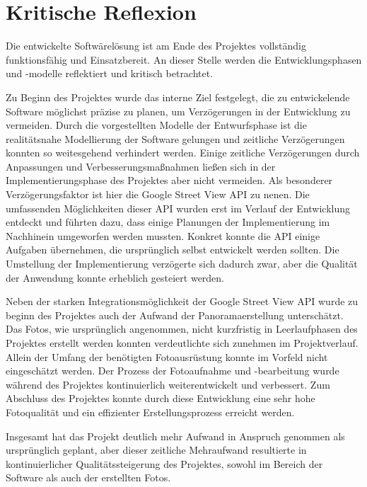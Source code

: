 \section{Kritische Reflexion}
\label{sec:KritischeReflexion}

Die entwickelte Softwärelösung ist am Ende des Projektes vollständig funktionsfähig und Einsatzbereit.
An dieser Stelle werden die Entwicklungsphasen und -modelle reflektiert und kritisch betrachtet.

Zu Beginn des Projektes wurde das interne Ziel festgelegt, die zu entwickelende Software möglichst präzise
zu planen, um Verzögerungen in der Entwicklung zu vermeiden. Durch die vorgestellten Modelle der Entwurfsphase
ist die realitätsnahe Modellierung der Software gelungen und zeitliche Verzögerungen konnten so weitesgehend
verhindert werden. Einige zeitliche Verzögerungen durch Anpassungen und Verbesserungsmaßnahmen ließen sich in der
Implementierungsphase des Projektes aber nicht vermeiden. Als besonderer Verzögerungsfaktor ist hier die
Google Street View API zu nenen. Die umfassenden Möglichkeiten dieser API wurden erst im Verlauf der
Entwicklung entdeckt und führten dazu, dass einige Planungen der Implementierung im Nachhinein umgeworfen
werden mussten. Konkret konnte die API einige Aufgaben übernehmen, die ursprünglich selbst
entwickelt werden sollten. Die Umstellung der Implementierung verzögerte sich dadurch zwar, aber die
Qualität der Anwendung konnte erheblich gesteiert werden.

Neben der starken Integrationsmöglichkeit der Google Street View API wurde zu beginn des Projektes auch
der Aufwand der Panoramaerstellung unterschätzt. Das Fotos, wie ursprünglich angenommen, nicht kurzfristig
in Leerlaufphasen des Projektes erstellt werden konnten verdeutlichte sich zunehmen im Projektverlauf.
Allein der Umfang der benötigten Fotoausrüstung konnte im Vorfeld nicht eingeschätzt werden.
Der Prozess der Fotoaufnahme und -bearbeitung wurde während des Projektes kontinuierlich weiterentwickelt
und verbessert. Zum Abschluss des Projektes konnte durch diese Entwicklung eine sehr hohe Fotoqualität
und ein effizienter Erstellungsprozess erreicht werden.

Insgesamt hat das Projekt deutlich mehr Aufwand in Anspruch genommen als ursprünglich geplant,
aber dieser zeitliche Mehraufwand resultierte in kontinuierlicher Qualitätssteigerung des Projektes, sowohl
im Bereich der Software als auch der erstellten Fotos.